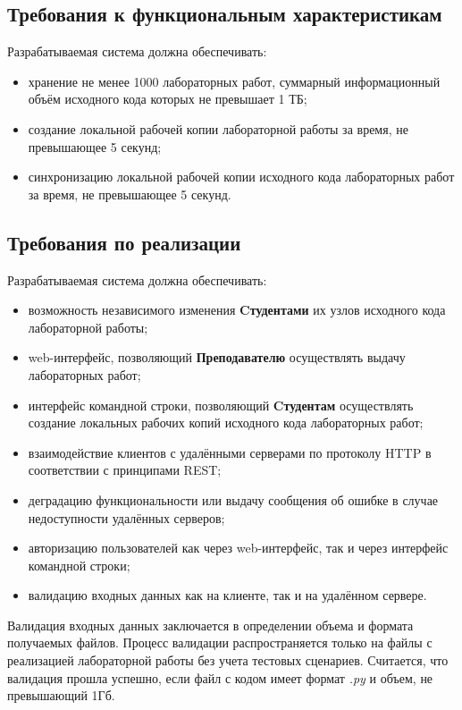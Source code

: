 \documentclass{bmstu}
\begin{document}
  \subsection{Требования к функциональным характеристикам}

  Разрабатываемая система должна обеспечивать:
  \begin{itemize}[label=---]
    \item хранение не менее 1000 лабораторных работ, суммарный
      информационный объём исходного кода которых не превышает 1 ТБ;
    \item создание локальной рабочей копии лабораторной работы за
      время, не превышающее 5 секунд;
    \item синхронизацию локальной рабочей копии исходного кода
      лабораторных работ за время, не превышающее 5 секунд.
  \end{itemize}

  \subsection{Требования по реализации}

  Разрабатываемая система должна обеспечивать:
  \begin{itemize}[label=---]
    \item возможность независимого изменения \textbf{Cтудентами} их узлов
      исходного кода лабораторной работы;
    \item web-интерфейс, позволяющий \textbf{Преподавателю} осуществлять выдачу
      лабораторных работ;
    \item интерфейс командной строки, позволяющий \textbf{Cтудентам}
      осуществлять создание локальных рабочих копий исходного кода
      лабораторных работ;
    \item взаимодействие клиентов с удалёнными серверами по протоколу
      HTTP в соответствии с принципами REST;
    \item деградацию функциональности или выдачу сообщения об ошибке в
      случае недоступности удалённых серверов;
    \item авторизацию пользователей как через web-интерфейс, так и
      через интерфейс командной строки;
    \item валидацию входных данных как на клиенте, так и на удалённом
      сервере.
  \end{itemize}
  
  Валидация входных данных заключается в определении объема и формата получаемых файлов.
  Процесс валидации распространяется только на файлы с реализацией лабораторной работы без учета тестовых сценариев.
  Считается, что валидация прошла успешно, если файл с кодом имеет формат \textit{.py} и объем, не превышающий 1Гб.
\end{document}
